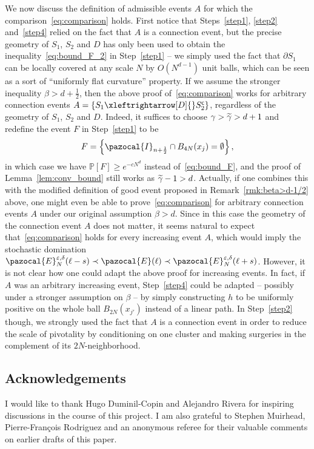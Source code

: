 \documentclass[AHL,Unicode,longabstracts,published]{cedram}
\renewcommand{\P}{\mathbb{P}}
\newcommand{\sfc}{\mathsf{c}}
\newcommand{\lr}[4]{#3\xleftrightarrow[#1]{#2} #4}
\let\oldtilde\tilde
\renewcommand*{\tilde}[1]{\mathchoice{\widetilde{#1}}{\widetilde{#1}}{\oldtilde{#1}}{\oldtilde{#1}}}
\begin{document}
\begin{rema}\label{rmk:beta>d}
We now discuss the definition of admissible events $A$ for which the comparison~\eqref{eq:comparison} holds. First notice that Steps~\ref{step1}, \ref{step2} and~\ref{step4} relied on the fact that $A$ is a connection event, but the precise geometry of $S_1$, $S_2$ and $D$ has only been used to obtain the inequality~\eqref{eq:bound_F_2} in Step~\ref{step1} -- we simply used the fact that $\partial S_1$ can be locally covered at any scale $N$ by $O(N^{d-1})$ unit balls, which can be seen as a sort of ``uniformly flat curvature'' property. If we assume the stronger inequality $\beta>d+\tfrac12$, then the above proof of~\eqref{eq:comparison} works for arbitrary connection events $A=\{\lr{D}{}{S_1}{S_2^{\sfc}}\}$,
regardless of the geometry of $S_1$, $S_2$ and $D$. Indeed, it suffices to choose $\gamma>\tilde{\gamma}>d+1$ and redefine the event $F$ in Step~\ref{step1} to be 
\[
F=\left\{\pazocal{I}_{n+\frac12}\cap B_{4N}(x_j)=\emptyset\right\},
\]
in which case we have $\P[F]\geq e^{-cN^d}$ instead of~\eqref{eq:bound_F}, and the proof of Lemma~\ref{lem:conv_bound} still works as $\tilde{\gamma}-1>d$. Actually, if one combines this with the modified definition of good event proposed in Remark~\ref{rmk:beta>d-1/2} above, one might even be able to prove~\eqref{eq:comparison} for arbitrary connection events $A$ under our original assumption $\beta>d$. Since in this case the geometry of the connection event $A$ does not matter, it seems natural to expect that~\eqref{eq:comparison} holds for every increasing event $A$, which would imply the stochastic domination $\pazocal{E}^{\varepsilon,\delta}_{N}(\ell-s)\prec\pazocal{E}(\ell)\prec\pazocal{E}^{\varepsilon,\delta}_{N}(\ell+s)$. However, it is not clear how one could adapt the above proof for increasing events. In fact, if $A$ was an arbitrary increasing event, Step~\ref{step4} could be adapted -- possibly under a stronger assumption on $\beta$ -- by simply constructing $h$ to be uniformly positive on the whole ball $B_{2N}(x_{j'})$ instead of a linear path. In Step~\ref{step2} though, we strongly used the fact that $A$ is a connection event in order to reduce the scale of pivotality by conditioning on one cluster and making surgeries in the complement of its $2N$-neighborhood.
\end{rema}


\subsection*{Acknowledgements}

I would like to thank Hugo Duminil-Copin and Alejandro Rivera for inspiring discussions in the course of this project. I am also grateful to Stephen Muirhead, Pierre-Fran\c{c}ois Rodriguez and an anonymous referee for their valuable comments on earlier drafts of this paper.



\end{document}
